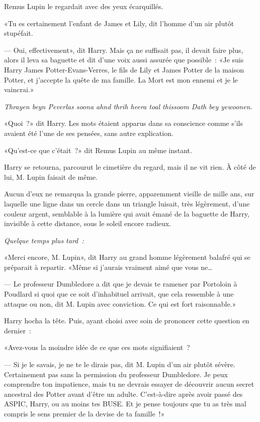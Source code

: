 Remus Lupin le regardait avec des yeux écarquillés.

«Tu es certainement l'enfant de James et Lily, dit l'homme d'un air plutôt stupéfait.

--- Oui, effectivement», dit Harry. Mais ça ne suffisait pas, il devait faire plus, alors il leva sa baguette et dit d'une voix aussi assurée que possible~: «Je suis Harry James Potter-Evans-Verres, le fils de Lily et James Potter de la maison Potter, et j'accepte la quête de ma famille. La Mort est mon ennemi et je le vaincrai.»

\emph{Thrayen beyn Peverlas soona ahnd thrih heera toal thissoom Dath bey yewoonen.}

«Quoi~?» dit Harry. Les mots étaient apparus dans sa conscience comme s'ils avaient été l'une de ses pensées, sans autre explication.

«Qu'est-ce que c'était~?» dit Remus Lupin au même instant.

Harry se retourna, parcourut le cimetière du regard, mais il ne vit rien. À côté de lui, M. Lupin faisait de même.

Aucun d'eux ne remarqua la grande pierre, apparemment vieille de mille ans, sur laquelle une ligne dans un cercle dans un triangle luisait, très légèrement, d'une couleur argent, semblable à la lumière qui avait émané de la baguette de Harry, invisible à cette distance, sous le soleil encore radieux.

\later

\emph{Quelque temps plus tard~:}

«Merci encore, M. Lupin», dit Harry au grand homme légèrement balafré qui se préparait à repartir. «Même si j'aurais vraiment aimé que vous ne…

--- Le professeur Dumbledore a dit que je devais te ramener par Portoloin à Poudlard si quoi que ce soit d'inhabituel arrivait, que cela ressemble à une attaque ou non, dit M. Lupin avec conviction. Ce qui est fort raisonnable.»

Harry hocha la tête. Puis, ayant choisi avec soin de prononcer cette question en dernier~:

«Avez-vous la moindre idée de ce que ces mots signifiaient~?

--- Si je le savais, je ne te le dirais pas, dit M. Lupin d'un air plutôt sévère. Certainement pas sans la permission du professeur Dumbledore. Je peux comprendre ton impatience, mais tu ne devrais essayer de découvrir aucun secret ancestral des Potter avant d'être un adulte. C'est-à-dire après avoir passé des ASPIC, Harry, ou au moins tes BUSE. Et je pense toujours que tu as très mal compris le sens premier de la devise de ta famille~!»

